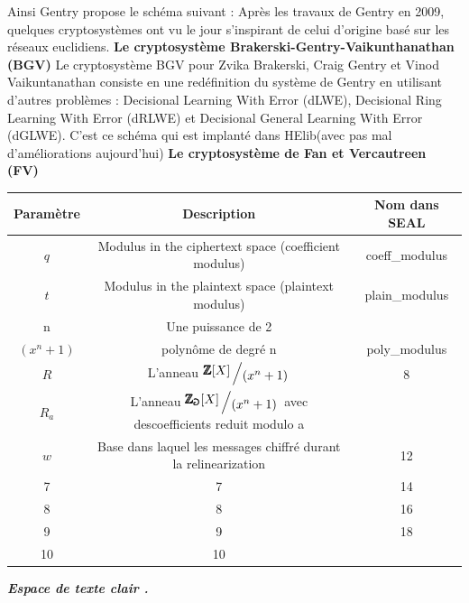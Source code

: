 \documentclass[a4paper,12pt]{report}
\begin{document}
Ainsi Gentry propose le schéma suivant :\newline
{}
Après les travaux de Gentry en 2009, quelques cryptosystèmes ont vu le jour s’inspirant de celui d’origine basé sur les réseaux euclidiens.\newline
\textbf{Le cryptosystème Brakerski-Gentry-Vaikunthanathan (BGV)}\newline
Le cryptosystème BGV pour Zvika Brakerski, Craig Gentry et Vinod Vaikuntanathan consiste en une redéfinition du système de Gentry en
utilisant d’autres problèmes : Decisional Learning With Error (dLWE), Decisional Ring Learning With Error (dRLWE) et Decisional General Learning With Error (dGLWE). C’est ce schéma qui est implanté dans HElib(avec pas mal d’améliorations aujourd’hui)
\textbf{Le cryptosystème de Fan et Vercautreen (FV)}\newline
\newline
\newline
\vspace{100\baselineskip}
\newcommand{\bigslant}[2]{{\raisebox{.2em}{$#1$}\left/\raisebox{-.2em}{$#2$}\right.}}
\begin{tabular}{|c|c|c|}

\hline
 Paramètre& Description & Nom dans SEAL \\
\hline
$q$ & Modulus in the ciphertext space (coefficient modulus) & coeff\_modulus  \\
\hline
$t$ & Modulus in the plaintext space (plaintext modulus) & plain\_modulus \\
\hline
n & Une puissance de 2 &   \\
\hline
$(x^{n}+1)$ & polynôme de degré n  & poly\_modulus  \\
\hline
$R$ & L'anneau $\bigslant{\pmb{\mathbb{Z}}[X]}{(x^{n}+1)}$ & 8  \\
\hline
$R_a$ & L'anneau $\bigslant{\pmb{\mathbb{Z_a}}[X]}{(x^{n}+1)}$ avec descoefficients reduit modulo a &  \\
\hline
$w$ & Base dans laquel les messages chiffré durant la relinearization & 12 \\
\hline
7 & 7 & 14 \\
\hline
8 & 8 & 16 \\
\hline
9 & 9 & 18 \\
\hline
10 & 10 & \\
\hline

\end{tabular}
\newline
\textbf{\textit{ Espace de texte clair .}}\newline
\end{document}
